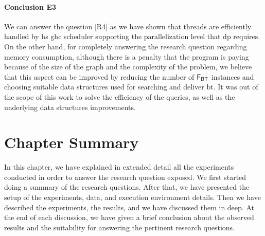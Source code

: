\paragraph{Conclusion E3} We can answer the question [R4] as we have shown that threads are efficiently handled by \acrshort{hs} \acrshort{ghc} scheduler supporting the parallelization level that \acrshort{dp} requires. 
On the other hand, for completely answering the research question regarding memory consumption, although there is a penalty that the program is paying because of the size of the graph and the complexity of the problem, we believe that this aspect can be improved by reducing the number of $\mathsf{F_{BT}}$ instances and choosing suitable data structures used for searching and deliver \acrshort{bt}. 
It was out of the scope of this work to solve the efficiency of the queries, as well as the underlying data structures improvements. 

\section{Chapter Summary}
In this chapter, we have explained in extended detail all the experiments conducted in order to answer the research question exposed.
We first started doing a summary of the research questions. After that, we have presented the setup of the experiments, data, and execution environment details.
Then we have described the experiments, the results, and we have discussed them in deep. At the end of each discussion, we have given a brief conclusion about the observed results and the suitability for answering the pertinent research questions.
